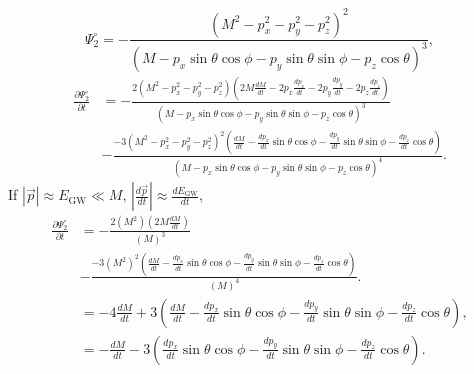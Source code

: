 \documentclass{ctexbeamer}
\begin{document}
    \begin{frame}
        \scriptsize
        \begin{equation*}
            \Psi_2^\circ=-\frac{(M^2-p_x^2-p_y^2-p_z^2)^2}
            {(M-p_x\sin\theta\cos\phi-p_y\sin\theta\sin\phi-p_z\cos\theta)^3},
        \end{equation*}
        \begin{align}
            \frac{\partial\Psi_2^\circ}{\partial t}&=
            -\frac{2(M^2-p_x^2-p_y^2-p_z^2)
            (2M\frac{dM}{dt}-2p_x\frac{dp_x}{dt}-2p_y\frac{dp_y}{dt}-2p_z\frac{dp_z}{dt})}
            {(M-p_x\sin\theta\cos\phi-p_y\sin\theta\sin\phi-p_z\cos\theta)^3}\nonumber\\
            &-\frac{-3(M^2-p_x^2-p_y^2-p_z^2)^2
            (\frac{dM}{dt}-\frac{dp_x}{dt}\sin\theta\cos\phi-\frac{dp_y}{dt}\sin\theta\sin\phi-\frac{dp_z}{dt}\cos\theta)}
            {(M-p_x\sin\theta\cos\phi-p_y\sin\theta\sin\phi-p_z\cos\theta)^4}.
        \end{align}
        \normalsize
        If $\left\lvert\vec{p}\right\rvert\approx E_\text{GW}\ll M$, $\left\lvert\frac{d\vec{p}}{dt}\right\rvert\approx\frac{dE_\text{GW}}{dt}$,
        \scriptsize
        \begin{align}
            \frac{\partial\Psi_2^\circ}{\partial t}&=
            -\frac{2(M^2)
            (2M\frac{dM}{dt})}
            {(M)^3}\nonumber\\
            &-\frac{-3(M^2)^2
            (\frac{dM}{dt}-\frac{dp_x}{dt}\sin\theta\cos\phi-\frac{dp_y}{dt}\sin\theta\sin\phi-\frac{dp_z}{dt}\cos\theta)}
            {(M)^4}.\\
            &=-4\frac{dM}{dt}+3(\frac{dM}{dt}-\frac{dp_x}{dt}\sin\theta\cos\phi-\frac{dp_y}{dt}\sin\theta\sin\phi-\frac{dp_z}{dt}\cos\theta),\\
            &=-\frac{dM}{dt}-3(\frac{dp_x}{dt}\sin\theta\cos\phi-\frac{dp_y}{dt}\sin\theta\sin\phi-\frac{dp_z}{dt}\cos\theta).
        \end{align}
    \end{frame}
\end{document}
